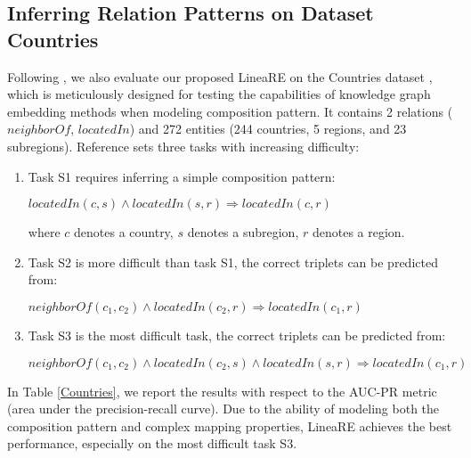 \documentclass[conference]{IEEEtran}
\begin{document}
\subsection{Inferring Relation Patterns on Dataset Countries}
Following \cite{Bouchard2015On,nickel2016holographic,RotatE}, we also evaluate our proposed LineaRE on the Countries dataset \cite{Bouchard2015On, nickel2016holographic}, which is meticulously designed for testing the capabilities of knowledge graph embedding methods when modeling composition pattern. It contains 2 relations ($neighborOf$, $locatedIn$) and 272 entities (244 countries, 5 regions, and 23 subregions). Reference \cite{nickel2016holographic} sets three tasks with increasing difficulty:
\begin{enumerate}
	\item Task S1 requires inferring a simple composition pattern:
	\begin{center}
		$locatedIn(c,s) \wedge locatedIn(s,r) \Rightarrow locatedIn(c,r)$
	\end{center}
	where $c$ denotes a country, $s$ denotes a subregion, $r$ denotes a region.
	\item Task S2 is more difficult than task S1, the correct triplets can be predicted from:
	\begin{center}
		$neighborOf(c_1,c_2) \wedge locatedIn(c_2,r) \Rightarrow locatedIn(c_1,r)$
	\end{center}
	\item Task S3 is the most difficult task, the correct triplets can be predicted from:
	\begin{center}
		$neighborOf(c_1,c_2) \wedge locatedIn(c_2,s) \wedge locatedIn(s,r) \Rightarrow locatedIn(c_1,r)$
	\end{center}
\end{enumerate}
In Table \ref{Countries}, we report the results with respect to the AUC-PR metric (area under the precision-recall curve). Due to the ability of modeling both the composition pattern and complex mapping properties, LineaRE achieves the best performance, especially on the most difficult task S3.
\end{document}
